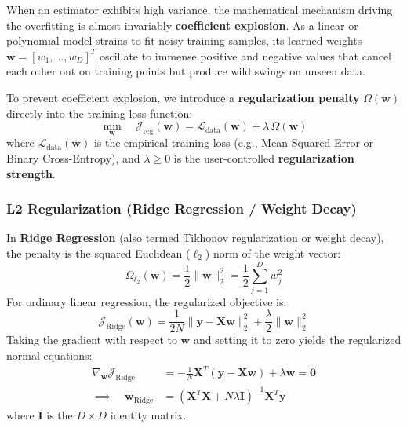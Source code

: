 When an estimator exhibits high variance, the mathematical mechanism driving the overfitting is almost invariably \textbf{coefficient explosion}. As a linear or polynomial model strains to fit noisy training samples, its learned weights $\mathbf{w} = [w_1, \dots, w_D]^T$ oscillate to immense positive and negative values that cancel each other out on training points but produce wild swings on unseen data.

To prevent coefficient explosion, we introduce a \textbf{regularization penalty} $\Omega(\mathbf{w})$ directly into the training loss function:
\begin{equation}
\min_{\mathbf{w}} \quad \mathcal{J}_{\text{reg}}(\mathbf{w}) = \mathcal{L}_{\text{data}}(\mathbf{w}) + \lambda \, \Omega(\mathbf{w})\label{eq:penalized_loss}
\end{equation}
where $\mathcal{L}_{\text{data}}(\mathbf{w})$ is the empirical training loss (e.g., Mean Squared Error or Binary Cross-Entropy), and $\lambda \ge 0$ is the user-controlled \textbf{regularization strength}.

\subsubsection{L2 Regularization (Ridge Regression / Weight Decay)}

In \textbf{Ridge Regression} (also termed Tikhonov regularization or weight decay), the penalty is the squared Euclidean ($\ell_2$) norm of the weight vector:
\begin{equation}
\Omega_{\ell_2}(\mathbf{w}) = \frac{1}{2} \|\mathbf{w}\|_2^2 = \frac{1}{2} \sum_{j=1}^D w_j^2\label{eq:l2_norm_def}
\end{equation}
For ordinary linear regression, the regularized objective is:
\begin{equation}
\mathcal{J}_{\text{Ridge}}(\mathbf{w}) = \frac{1}{2N} \|\mathbf{y} - \mathbf{X}\mathbf{w}\|_2^2 + \frac{\lambda}{2} \|\mathbf{w}\|_2^2\label{eq:ridge_objective}
\end{equation}
Taking the gradient with respect to $\mathbf{w}$ and setting it to zero yields the regularized normal equations:
\begin{align}
\nabla_{\mathbf{w}} \mathcal{J}_{\text{Ridge}} &= -\frac{1}{N} \mathbf{X}^T (\mathbf{y} - \mathbf{X}\mathbf{w}) + \lambda \mathbf{w} = \mathbf{0} \nonumber \\
\implies \quad \mathbf{w}_{\text{Ridge}} &= \left( \mathbf{X}^T\mathbf{X} + N\lambda \mathbf{I} \right)^{-1} \mathbf{X}^T \mathbf{y}\label{eq:ridge_analytical_solution}
\end{align}
where $\mathbf{I}$ is the $D \times D$ identity matrix.

